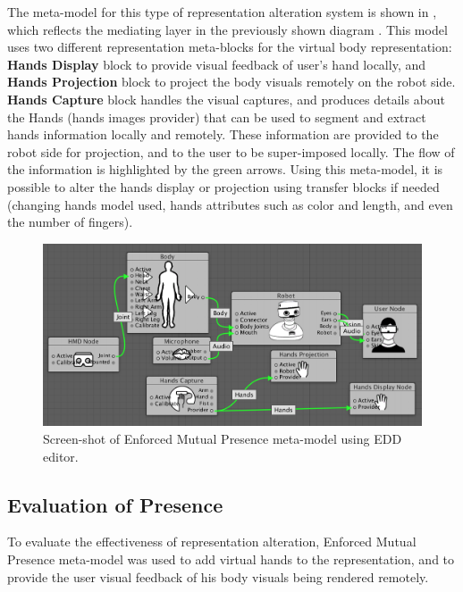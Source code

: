 The meta-model for this type of representation alteration system is shown in , which reflects the mediating layer in the previously shown diagram . This model uses two different representation meta-blocks for the virtual body representation: \textbf{Hands Display} block to provide visual feedback of user's hand locally, and \textbf{Hands Projection} block to project the body visuals remotely on the robot side. \textbf{Hands Capture} block handles the visual captures, and produces details about the Hands (hands images provider) that can be used to segment and extract hands information locally and remotely. These information are provided to the robot side for projection, and to the user to be super-imposed locally. The flow of the information is highlighted by the green arrows. Using this meta-model, it is possible to alter the hands display or projection using transfer blocks if needed (changing hands model used, hands attributes such as color and length, and even the number of fingers). 


\begin{figure}[htpb]
  \centering
  \captionsetup{justification=centering}
  \includegraphics[width=1\linewidth]{figures/eval/ET/ET_meta.png}
  \caption{Screen-shot of Enforced Mutual Presence meta-model using EDD editor.}
  \label{fig:eval-ET-metamodel}
\end{figure}


\subsection{Evaluation of Presence}
To evaluate the effectiveness of representation alteration, Enforced Mutual Presence meta-model was used to add virtual hands to the representation, and to provide the user visual feedback of his body visuals being rendered remotely. 

